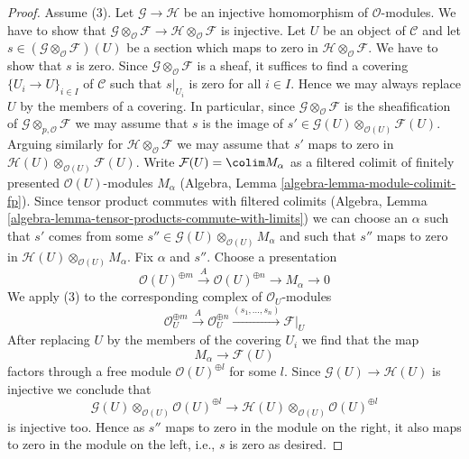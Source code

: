\begin{proof}
\medskip\noindent
Assume (3). Let $\mathcal{G} \to \mathcal{H}$ be an injective homomorphism
of $\mathcal{O}$-modules. We have to show that
$\mathcal{G} \otimes_\mathcal{O} \mathcal{F} \to
\mathcal{H} \otimes_\mathcal{O} \mathcal{F}$
is injective. Let $U$ be an object of $\mathcal{C}$
and let $s \in (\mathcal{G} \otimes_\mathcal{O} \mathcal{F})(U)$
be a section which maps to zero in
$\mathcal{H} \otimes_\mathcal{O} \mathcal{F}$.
We have to show that $s$ is zero. Since
$\mathcal{G} \otimes_\mathcal{O} \mathcal{F}$
is a sheaf, it suffices to find a covering $\{U_i \to U\}_{i \in I}$
of $\mathcal{C}$ such that $s|_{U_i}$ is zero for all $i \in I$.
Hence we may always replace $U$ by the members of a covering.
In particular, since $\mathcal{G} \otimes_\mathcal{O} \mathcal{F}$
is the sheafification of $\mathcal{G} \otimes_{p, \mathcal{O}} \mathcal{F}$
we may assume that $s$ is the image of $s' \in 
\mathcal{G}(U) \otimes_{\mathcal{O}(U)} \mathcal{F}(U)$.
Arguing similarly for $\mathcal{H} \otimes_\mathcal{O} \mathcal{F}$
we may assume that $s'$ maps to zero in
$\mathcal{H}(U) \otimes_{\mathcal{O}(U)} \mathcal{F}(U)$.
Write $\mathcal{F}(U) = \colim M_\alpha$ as a filtered colimit of finitely
presented $\mathcal{O}(U)$-modules $M_\alpha$
(Algebra, Lemma \ref{algebra-lemma-module-colimit-fp}).
Since tensor product commutes with filtered colimits
(Algebra, Lemma \ref{algebra-lemma-tensor-products-commute-with-limits})
we can choose an $\alpha$ such that $s'$
comes from some $s'' \in \mathcal{G}(U) \otimes_{\mathcal{O}(U)} M_\alpha$
and such that $s''$ maps to zero in
$\mathcal{H}(U) \otimes_{\mathcal{O}(U)} M_\alpha$.
Fix $\alpha$ and $s''$.
Choose a presentation
$$
\mathcal{O}(U)^{\oplus m} \xrightarrow{A} \mathcal{O}(U)^{\oplus n}
\to M_\alpha \to 0
$$
We apply (3) to the corresponding complex of $\mathcal{O}_U$-modules
$$
\mathcal{O}_U^{\oplus m} \xrightarrow{A}
\mathcal{O}_U^{\oplus n} \xrightarrow{(s_1, \ldots, s_n)}
\mathcal{F}|_U
$$
After replacing $U$ by the members of the covering $U_i$
we find that the map
$$
M_\alpha \to \mathcal{F}(U)
$$
factors through a free module $\mathcal{O}(U)^{\oplus l}$ for some $l$.
Since $\mathcal{G}(U) \to \mathcal{H}(U)$ is injective
we conclude that
$$
\mathcal{G}(U) \otimes_{\mathcal{O}(U)} \mathcal{O}(U)^{\oplus l}
\to
\mathcal{H}(U) \otimes_{\mathcal{O}(U)} \mathcal{O}(U)^{\oplus l}
$$
is injective too. Hence as $s''$ maps to zero in the module on
the right, it also maps to zero in the module on the left, i.e.,
$s$ is zero as desired.
\end{proof}

